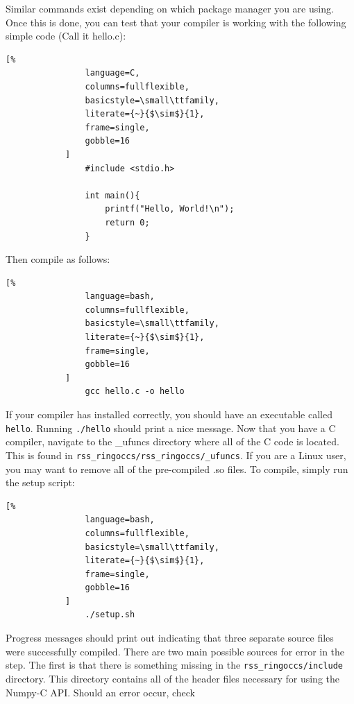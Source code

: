 \documentclass[titlepage, 12pt]{article}
\begin{document}
            Similar commands exist depending on which package manager
            you are using. Once this is done, you can test that
            your compiler is working with the following simple code
            (Call it hello.c):
            \begin{lstlisting}[%
                language=C,
                columns=fullflexible,
                basicstyle=\small\ttfamily,
                literate={~}{$\sim$}{1},
                frame=single,
                gobble=16
            ]
                #include <stdio.h>
                
                int main(){
                    printf("Hello, World!\n");
                    return 0;
                }
            \end{lstlisting}
            Then compile as follows:
            \begin{lstlisting}[%
                language=bash,
                columns=fullflexible,
                basicstyle=\small\ttfamily,
                literate={~}{$\sim$}{1},
                frame=single,
                gobble=16
            ]
                gcc hello.c -o hello
            \end{lstlisting}
            If your compiler has installed correctly, you should 
            have an executable called \texttt{hello}. Running
            \texttt{./hello} should print a nice message.
            Now that you have a C compiler, navigate to the
            \_ufuncs directory where all of the C code is located.
            This is found in
            \texttt{rss\_ringoccs/rss\_ringoccs/\_ufuncs}.
            If you are a Linux user, you may want to remove all of
            the pre-compiled .so files. To compile, simply run
            the setup script:
            \begin{lstlisting}[%
                language=bash,
                columns=fullflexible,
                basicstyle=\small\ttfamily,
                literate={~}{$\sim$}{1},
                frame=single,
                gobble=16
            ]
                ./setup.sh
            \end{lstlisting}
            Progress messages should print out indicating that 
             three separate source files were successfully compiled.
            There are two main possible sources for error in the step.
            The first is that there is something missing in the
            \texttt{rss\_ringoccs/include} directory. This
            directory contains all of the header files necessary
            for using the Numpy-C API. Should an error occur, check
\end{document}
